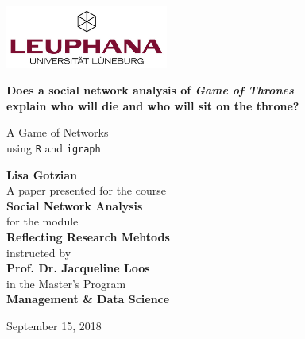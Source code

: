 \begin{titlepage}
    \begin{center}
        \includegraphics[width=0.4\textwidth]{leuphanalogo}       
        \vspace*{1cm}
        
        \huge
        \textbf{Does a social network analysis of \textit{Game of Thrones}\\ explain who will die and who will sit on the throne?}
        
        \vspace{0.5cm}
        \LARGE
        A Game of Networks \\ using \texttt{R} and \texttt{igraph}
        
        \vspace{2.5cm}
        \large
        \textbf{Lisa Gotzian}\\
        
        \vfill
        \large
        A paper presented for the course \\
        \textbf{Social Network Analysis}\\
        for the module\\
        \textbf{Reflecting Research Mehtods}\\
        instructed by\\
        \textbf{Prof. Dr. Jacqueline Loos}\\
        in the Master's Program\\
        \textbf{Management \& Data Science}
        
        \vspace{0.8cm}
        
        September 15, 2018
        
    \end{center}
\end{titlepage}